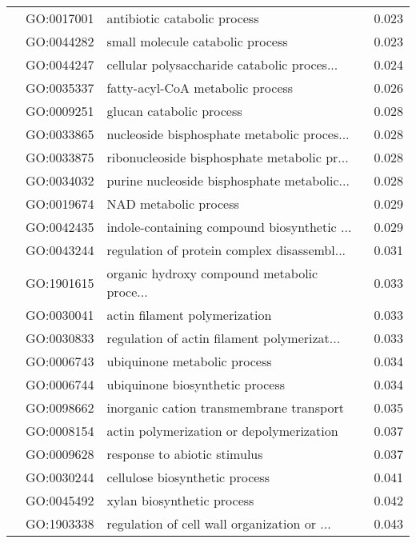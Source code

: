 \begin{longtable}{lllr}
   & GO:0017001 &                 antibiotic catabolic process &         0.023 \\
   & GO:0044282 &             small molecule catabolic process &         0.023 \\
   & GO:0044247 &  cellular polysaccharide catabolic proces... &         0.024 \\
   & GO:0035337 &             fatty-acyl-CoA metabolic process &         0.026 \\
   & GO:0009251 &                     glucan catabolic process &         0.028 \\
   & GO:0033865 &  nucleoside bisphosphate metabolic proces... &         0.028 \\
   & GO:0033875 &  ribonucleoside bisphosphate metabolic pr... &         0.028 \\
   & GO:0034032 &  purine nucleoside bisphosphate metabolic... &         0.028 \\
   & GO:0019674 &                        NAD metabolic process &         0.029 \\
   & GO:0042435 &  indole-containing compound biosynthetic ... &         0.029 \\
   & GO:0043244 &  regulation of protein complex disassembl... &         0.031 \\
   & GO:1901615 &  organic hydroxy compound metabolic proce... &         0.033 \\
   & GO:0030041 &                actin filament polymerization &         0.033 \\
   & GO:0030833 &  regulation of actin filament polymerizat... &         0.033 \\
   & GO:0006743 &                 ubiquinone metabolic process &         0.034 \\
   & GO:0006744 &              ubiquinone biosynthetic process &         0.034 \\
   & GO:0098662 &     inorganic cation transmembrane transport &         0.035 \\
   & GO:0008154 &     actin polymerization or depolymerization &         0.037 \\
   & GO:0009628 &                 response to abiotic stimulus &         0.037 \\
   & GO:0030244 &               cellulose biosynthetic process &         0.041 \\
   & GO:0045492 &                   xylan biosynthetic process &         0.042 \\
   & GO:1903338 &  regulation of cell wall organization or ... &         0.043 \\

\end{longtable}
